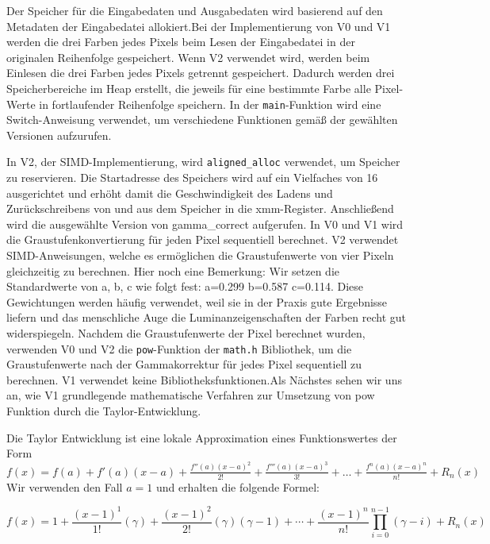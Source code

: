 \documentclass[course=erap]{aspdoc}
\begin{document}
\par
Der Speicher für die Eingabedaten und Ausgabedaten wird basierend auf den Metadaten der Eingabedatei allokiert.Bei der Implementierung von V0 und V1 werden die drei Farben jedes Pixels beim Lesen der Eingabedatei in der originalen Reihenfolge gespeichert. Wenn V2 verwendet wird, werden beim Einlesen die drei Farben jedes Pixels getrennt gespeichert. Dadurch werden drei Speicherbereiche im Heap erstellt, die jeweils für eine bestimmte Farbe alle Pixel-Werte in fortlaufender Reihenfolge speichern. In der \texttt{main}-Funktion wird eine Switch-Anweisung verwendet, um verschiedene Funktionen gemäß der gewählten Versionen aufzurufen.

\par
In V2, der SIMD-Implementierung, wird \texttt{aligned\_alloc}\cite{man2022aligned_alloc} verwendet, um Speicher zu reservieren. Die Startadresse des Speichers wird auf ein Vielfaches von 16 ausgerichtet und erhöht damit die Geschwindigkeit des Ladens und Zurückschreibens von und aus dem Speicher in die xmm-Register. Anschließend wird die ausgewählte Version von gamma\_correct aufgerufen. In V0 und V1 wird die Graustufenkonvertierung für jeden Pixel sequentiell berechnet. V2 verwendet SIMD-Anweisungen, welche es ermöglichen die Graustufenwerte von vier Pixeln gleichzeitig zu berechnen. Hier noch eine Bemerkung: Wir setzen die Standardwerte von a, b, c wie folgt fest: a=0.299 b=0.587 c=0.114. Diese Gewichtungen werden häufig verwendet\cite{wikipedia2024grayscale}, weil sie in der Praxis gute Ergebnisse liefern und das menschliche Auge die Luminanzeigenschaften der Farben recht gut widerspiegeln. Nachdem die Graustufenwerte der Pixel berechnet wurden, verwenden V0 und V2 die \texttt{pow}-Funktion der \texttt{math.h} Bibliothek, um die Graustufenwerte nach der Gammakorrektur für jedes Pixel sequentiell zu berechnen. V1 verwendet keine Bibliotheksfunktionen.Als Nächstes sehen wir uns an, wie V1 grundlegende mathematische Verfahren zur Umsetzung von pow Funktion durch die Taylor-Entwicklung.

\par
Die Taylor Entwicklung\cite{mathworld2024taylorseries} ist eine lokale Approximation eines Funktionswertes der Form $f(x) = f(a) + f'(a)(x-a) + \frac{{f''(a)(x-a)^2}}{2!} + \frac{{f'''(a)(x-a)^3}}{3!} + \ldots + \frac{{f^n(a)(x-a)^n}}{n!} + R_n(x) $ Wir verwenden den Fall $a=1$ und erhalten die folgende Formel:

\begin{equation}
f(x) = 1 + \frac{(x-1)^1}{1!} (\gamma) + \frac{(x-1)^2}{2!} (\gamma)(\gamma-1)  + \cdots + \frac{(x-1)^n}{n!} \prod_{i=0}^{n-1} (\gamma-i) + R_n(x)
\end{equation}
\end{document}
